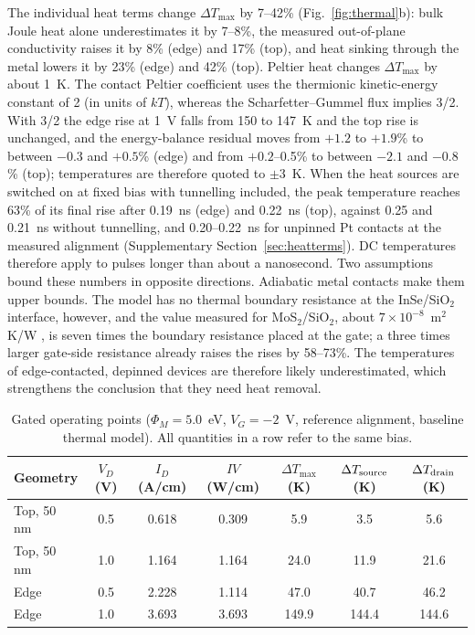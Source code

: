 \documentclass[11pt]{article}
\begin{document}
The individual heat terms change $\Delta T_{\max}$ by 7--42\% (Fig.~\ref{fig:thermal}b): bulk Joule heat alone underestimates it by 7--8\%, the measured out-of-plane conductivity raises it by 8\% (edge) and 17\% (top), and heat sinking through the metal lowers it by 23\% (edge) and 42\% (top). Peltier heat changes $\Delta T_{\max}$ by about 1~K. The contact Peltier coefficient uses the thermionic kinetic-energy constant of 2 (in units of $kT$), whereas the Scharfetter--Gummel flux implies 3/2. With 3/2 the edge rise at 1~V falls from 150 to 147~K and the top rise is unchanged, and the energy-balance residual moves from $+1.2$ to $+1.9$\% to between $-0.3$ and $+0.5$\% (edge) and from $+0.2$--0.5\% to between $-2.1$ and $-0.8$\% (top); temperatures are therefore quoted to $\pm3$~K. When the heat sources are switched on at fixed bias with tunnelling included, the peak temperature reaches 63\% of its final rise after 0.19~ns (edge) and 0.22~ns (top), against 0.25 and 0.21~ns without tunnelling, and 0.20--0.22~ns for unpinned Pt contacts at the measured alignment (Supplementary Section~\ref{sec:heatterms}). DC temperatures therefore apply to pulses longer than about a nanosecond. Two assumptions bound these numbers in opposite directions. Adiabatic metal contacts make them upper bounds. The model has no thermal boundary resistance at the InSe/SiO$_2$ interface, however, and the value measured for MoS$_2$/SiO$_2$, about $7\times10^{-8}$~m$^2$K/W \cite{siyalon}, is seven times the boundary resistance placed at the gate; a three times larger gate-side resistance already raises the rises by 58--73\%. The temperatures of edge-contacted, depinned devices are therefore likely underestimated, which strengthens the conclusion that they need heat removal.

\begin{table}[!htbp]
\centering
\caption{Gated operating points ($\Phi_M=5.0$~eV, $V_G=-2$~V, reference alignment, baseline thermal model). All quantities in a row refer to the same bias.}
\label{tab:therm}\small
\begin{tabular}{lcccccc}
\toprule
Geometry & $V_D$ (V) & $I_D$ (A/cm) & $IV$ (W/cm) & $\Delta T_{\max}$ (K) & $\Delta T_{\rm source}$ (K) & $\Delta T_{\rm drain}$ (K) \\
\midrule
Top, 50 nm & 0.5 & 0.618 & 0.309 & 5.9 & 3.5 & 5.6 \\
Top, 50 nm & 1.0 & 1.164 & 1.164 & 24.0 & 11.9 & 21.6 \\
Edge & 0.5 & 2.228 & 1.114 & 47.0 & 40.7 & 46.2 \\
Edge & 1.0 & 3.693 & 3.693 & 149.9 & 144.4 & 144.6 \\
\bottomrule
\end{tabular}
\end{table}
\end{document}
